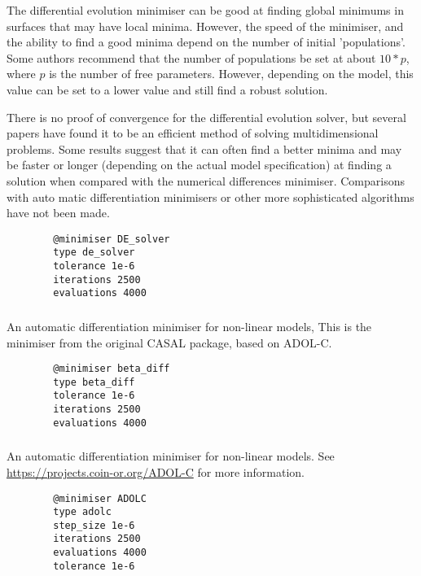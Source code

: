 The differential evolution minimiser can be good at finding global minimums in surfaces that may have local minima. However, the speed of the minimiser, and the ability to find a good minima depend on the number of initial 'populations'. Some authors recommend that the number of populations be set at about $10*p$, where $p$ is the number of free parameters. However, depending on the model, this value can be set to a lower value and still find a robust solution.

There is no proof of convergence for the differential evolution solver, but several papers have found it to be an efficient method of solving multidimensional problems. Some results suggest that it can often find a better minima and may be faster or longer (depending on the actual model specification) at finding a solution when compared with the numerical differences minimiser. Comparisons with auto matic differentiation minimisers or other more sophisticated algorithms have not been made.

{\small{\begin{verbatim}
		@minimiser DE_solver
		type de_solver
		tolerance 1e-6
		iterations 2500
		evaluations 4000
		\end{verbatim}}}

\subsubsection{}

An automatic differentiation minimiser for non-linear models, This is the minimiser from the original CASAL package, based on ADOL-C.

{\small{\begin{verbatim}
		@minimiser beta_diff
		type beta_diff
		tolerance 1e-6
		iterations 2500
		evaluations 4000
		\end{verbatim}}}

\subsubsection{}

An automatic differentiation minimiser for non-linear models. See \url{https://projects.coin-or.org/ADOL-C} for more information.

{\small{\begin{verbatim}
		@minimiser ADOLC
		type adolc
		step_size 1e-6
		iterations 2500
		evaluations 4000
		tolerance 1e-6
		\end{verbatim}}}

